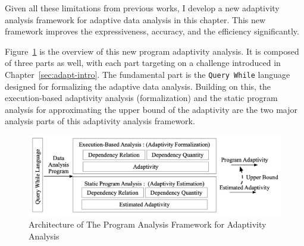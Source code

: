 
Given all these limitations from previous works, I develop a new adaptivity analysis framework for
adaptive data analysis in this chapter.
This new framework improves the expressiveness, accuracy, and the efficiency significantly.

Figure~\ref{fig:structure} is the overview of this new program adaptivity analysis.
It is composed of three parts as well, with each part targeting on a challenge introduced in Chapter~\ref{sec:adapt-intro}.
The fundamental part is the {\tt Query While} language designed for formalizing the 
adaptive data analysis. Building on this, 
the execution-based adaptivity analysis (formalization)
and the static program analysis for approximating the upper bound of the 
adaptivity are the two major analysis parts of this adaptivity analysis framework.
\begin{figure}
   \centering   
   \includegraphics[width=1.0\textwidth]{figures/overview.png}
  \caption{Architecture of The Program Analysis Framework for Adaptivity Analysis}
   \label{fig:structure}
\end{figure}